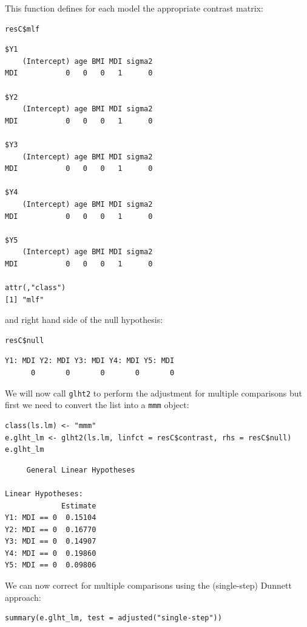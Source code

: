 \documentclass{article}
\begin{document}
This function defines for each model the appropriate contrast matrix:
\lstset{language=r,label= ,caption= ,captionpos=b,numbers=none}
\begin{lstlisting}
resC$mlf
\end{lstlisting}
\begin{verbatim}
$Y1
    (Intercept) age BMI MDI sigma2
MDI           0   0   0   1      0

$Y2
    (Intercept) age BMI MDI sigma2
MDI           0   0   0   1      0

$Y3
    (Intercept) age BMI MDI sigma2
MDI           0   0   0   1      0

$Y4
    (Intercept) age BMI MDI sigma2
MDI           0   0   0   1      0

$Y5
    (Intercept) age BMI MDI sigma2
MDI           0   0   0   1      0

attr(,"class")
[1] "mlf"
\end{verbatim}

and right hand side of the null hypothesis:
\lstset{language=r,label= ,caption= ,captionpos=b,numbers=none}
\begin{lstlisting}
resC$null
\end{lstlisting}

\begin{verbatim}
Y1: MDI Y2: MDI Y3: MDI Y4: MDI Y5: MDI 
      0       0       0       0       0
\end{verbatim}

We will now call \texttt{glht2} to perform the adjustment for multiple
comparisons but first we need to convert the list into a \texttt{mmm} object:
\lstset{language=r,label= ,caption= ,captionpos=b,numbers=none}
\begin{lstlisting}
class(ls.lm) <- "mmm"
e.glht_lm <- glht2(ls.lm, linfct = resC$contrast, rhs = resC$null)
e.glht_lm
\end{lstlisting}

\begin{verbatim}
	 General Linear Hypotheses

Linear Hypotheses:
             Estimate
Y1: MDI == 0  0.15104
Y2: MDI == 0  0.16770
Y3: MDI == 0  0.14907
Y4: MDI == 0  0.19860
Y5: MDI == 0  0.09806
\end{verbatim}

We can now correct for multiple comparisons using the (single-step)
Dunnett approach:
\lstset{language=r,label= ,caption= ,captionpos=b,numbers=none}
\begin{lstlisting}
summary(e.glht_lm, test = adjusted("single-step"))
\end{lstlisting}
\end{document}
